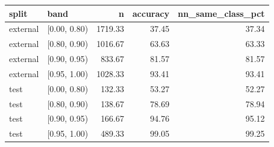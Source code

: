 \begin{tabular}{llrrr}
\toprule
split & band & n & accuracy & nn\_same\_class\_pct \\
\midrule
external & [0.00, 0.80) & 1719.33 & 37.45 & 37.34 \\
external & [0.80, 0.90) & 1016.67 & 63.63 & 63.33 \\
external & [0.90, 0.95) & 833.67 & 81.57 & 81.57 \\
external & [0.95, 1.00) & 1028.33 & 93.41 & 93.41 \\
test & [0.00, 0.80) & 132.33 & 53.27 & 52.27 \\
test & [0.80, 0.90) & 138.67 & 78.69 & 78.94 \\
test & [0.90, 0.95) & 166.67 & 94.76 & 95.12 \\
test & [0.95, 1.00) & 489.33 & 99.05 & 99.25 \\
\bottomrule
\end{tabular}
